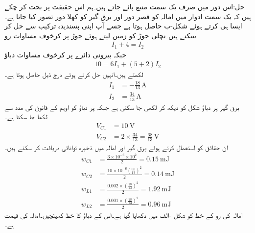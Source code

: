 حل:اس دور میں صرف یک سمت منبع پائے جاتے ہیں۔ہم اس حقیقت پر بحث کر چکے ہیں کہ یک سمت ادوار میں امالہ کو قصر دور اور برق گیر کو کھلا دور تصور کیا جاتا ہے۔ایسا ہی کرتے ہوئے  شکل-ب حاصل ہوتا ہے جسے آپ اپنی پسندیدہ  ترکیب سے حل کر سکتے ہیں۔نچلی جوڑ کو زمین لیتے ہوئے جوڑ  پر کرخوف مساوات رو
\begin{align*}
I_1+4=I_2
\end{align*} 
جبکہ بیرونی دائرے پر کرخوف مساوات دباؤ
\begin{align*}
10=6I_1+(5+2)I_2
\end{align*}
 لکھتے ہیں۔انہیں حل کرتے ہوئے درج ذیل حاصل ہوتا ہے۔
\begin{align*}
I_1&=-\frac{18}{13}\, \si{\ampere}\\
I_2&=\frac{34}{13}\,\si{\ampere}
\end{align*}
برق گیر  پر دباؤ شکل کو دیکھ کر لکھی جا سکتی ہے  جبکہ   پر دباؤ کو اوہم کے قانون کی مدد سے لکھا جا سکتا ہے۔
\begin{align*}
V_{C1}&=\SI{10}{\volt}\\
V_{C2}&=2 \times \frac{34}{13}=\frac{68}{13}\,\si{\volt}
\end{align*}
ان حقائق کو استعمال کرتے ہوئے برق گیر اور امالہ میں ذخیرہ توانائی دریافت کر سکتے ہیں۔
\begin{align*}
w_{C1}&=\frac{3\times 10^{-6} \times 10^2}{2}=\SI{0.15}{\milli\joule}\\
w_{C2}&=\frac{10 \times 10^{-6} \left(\frac{68}{13}\right)^2}{2}=\SI{0.14}{\milli\joule}\\
w_{L1}&=\frac{0.002\times \left(\frac{18}{13}\right)^2 }{2}=\SI{1.92}{\milli\joule}\\
w_{L2}&=\frac{0.001\times \left(\frac{18}{13}\right)^2}{2}=\SI{0.96}{\milli\joule}
\end{align*}
امالہ کی رو کے خط کو شکل -الف میں دکھایا گیا ہے۔اس کے دباؤ کا خط کھینچیں۔امالہ کی قیمت  ہے۔

